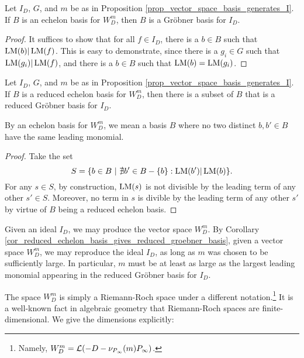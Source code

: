 \begin{proposition}
  Let $I_D$, $G$, and $m$ be as in Proposition \ref{prop_vector_space_basis_generates_I}.
  If $B$ is an echelon basis for $W_D^m$, then $B$ is a Gr\"obner basis for $I_D$.
\end{proposition}
\begin{proof}
  It suffices to show that for all $f \in I_D$, there is a $b \in B$ such that $\LM(b) | \LM(f)$.
  This is easy to demonstrate, since there is a $g_i \in G$ such that $\LM(g_i) | \LM(f)$,
  and there is a $b \in B$ such that $\LM(b) = \LM(g_i)$.
\end{proof}

\begin{corollary}
  \label{cor_reduced_echelon_basis_gives_reduced_groebner_basis}
  Let $I_D$, $G$, and $m$ be as in Proposition \ref{prop_vector_space_basis_generates_I}.
  If $B$ is a reduced echelon basis for $W_D^m$,
  then there is a subset of $B$ that is a reduced Gr\"obner basis for $I_D$.
\end{corollary}
By an echelon basis for $W_D^m$,
we mean a basis $B$ where no two distinct $b, b' \in B$ have the same leading monomial.
\begin{proof}
  Take the set
  \[ S = \{ b \in B ~|~ \nexists b' \in B-\{b\} : \LM(b') | \LM(b) \}. \]
  For any $s \in S$, by construction, $\LM(s)$ is not divisible by the leading term of any other $s' \in S$.
  Moreover, no term in $s$ is divible by the leading term of any other $s'$
  by virtue of $B$ being a reduced echelon basis.
\end{proof}
Given an ideal $I_D$, we may produce the vector space $W_D^m$.
By Corollary \ref{cor_reduced_echelon_basis_gives_reduced_groebner_basis},
given a vector space $W_D^m$, we may reproduce the ideal $I_D$,
as long as $m$ was chosen to be sufficiently large.
In particular, $m$ must be at least as large as
the largest leading monomial appearing in the reduced Gr\"obner basis for $I_D$.

The space $W_D^m$ is simply a Riemann-Roch space under a different notation.\footnote{Namely, $W_D^m = \cal L(-D - \nu_{P_\infty}(m)P_\infty)$.}
It is a well-known fact in algebraic geometry that Riemann-Roch spaces are finite-dimensional.
We give the dimensions explicitly:

